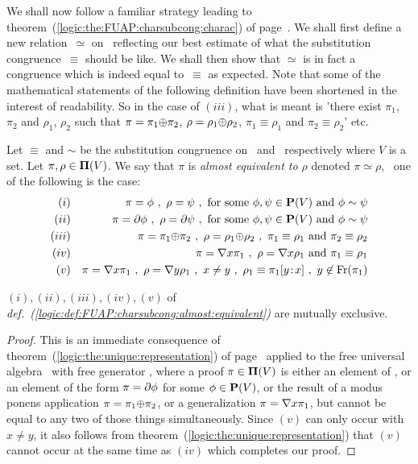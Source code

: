 We shall now follow a familiar strategy leading to
theorem~(\ref{logic:the:FUAP:charsubcong:charac}) of
page~\pageref{logic:the:FUAP:charsubcong:charac}. We shall first
define a new relation~$\simeq$ on \pvs\ reflecting our best estimate
of what the substitution congruence~$\equiv$ should be like. We
shall then show that $\simeq$ is in fact a congruence which is
indeed equal to~$\equiv$ as expected. Note that some of the
mathematical statements of the following definition have been
shortened in the interest of readability. So in the case of $(iii)$,
what is meant is 'there exist $\pi_{1}$, $\pi_{2}$ and $\rho_{1}$,
$\rho_{2}$ such that $\pi=\pi_{1}\mbox{$\oplus$}\pi_{2}$,
$\rho=\rho_{1}\mbox{$\oplus$}\rho_{2}$, $\pi_{1}\equiv\rho_{1}$ and
$\pi_{2}\equiv\rho_{2}$' etc.


\begin{defin}\label{logic:def:FUAP:charsubcong:almost:equivalent}
Let $\equiv$ and $\sim$ be the substitution congruence on \pvs\ and
\pv\ respectively where $V$ is a set. Let $\pi,\rho\in\mbox{${\bf\Pi}(V)$}$. We say
that $\pi$ is {\em almost equivalent to $\rho$} denoted
$\pi\simeq\rho$, \ifand\ one of the following is the case:
    \begin{eqnarray*}
    (i)&&\pi=\phi\ ,\ \rho=\psi\ ,\ \mbox{for some}\ \phi,\psi\in\pv\ \mbox{and}\ \phi\sim\psi\\
    (ii)&&\pi=\axi\phi\ ,\ \rho=\axi\psi\ ,\ \mbox{for some}\ \phi,\psi\in\pv\ \mbox{and}\ \phi\sim\psi\\
    (iii)&&\pi=\pi_{1}\pon\pi_{2}\ ,\ \rho=\rho_{1}\pon\rho_{2}\ ,\
    \pi_{1}\equiv\rho_{1}\ \mbox{and}\ \pi_{2}\equiv\rho_{2}\\
    (iv)&&\pi=\gen x\pi_{1}\ ,\ \rho=\gen x\rho_{1}\ \mbox{and}\ \pi_{1}\equiv\rho_{1}\\
    (v)&&\pi=\gen x\pi_{1}\ ,\ \rho=\gen y\rho_{1}\ ,\ x\neq y\ ,\
    \rho_{1}\equiv \pi_{1}[y\!:\!x]\ ,\ y\not\in\free(\pi_{1})
    \end{eqnarray*}
\end{defin}

\begin{prop}
$(i),(ii),(iii),(iv), (v)$ of {\em
def.~(\ref{logic:def:FUAP:charsubcong:almost:equivalent})} are
mutually exclusive.
\end{prop}
\begin{proof}
This is an immediate consequence of
theorem~(\ref{logic:the:unique:representation}) of
page~\pageref{logic:the:unique:representation} applied to the free
universal algebra \pvs\ with free generator \pv, where a proof
$\pi\in\mbox{${\bf\Pi}(V)$}$ is either an element of \pv, or an element of the form
$\pi=\mbox{$\partial$}\phi$ for some $\phi\in\mbox{${\bf P}(V)$}$, or the result of a modus
ponens application $\pi=\pi_{1}\mbox{$\oplus$}\pi_{2}$, or a generalization
$\pi=\mbox{$\nabla$} x\pi_{1}$, but cannot be equal to any two of those things
simultaneously. Since $(v)$ can only occur with $x\neq y$, it also
follows from theorem~(\ref{logic:the:unique:representation}) that
$(v)$ cannot occur at the same time as $(iv)$ which completes our
proof.
\end{proof}

